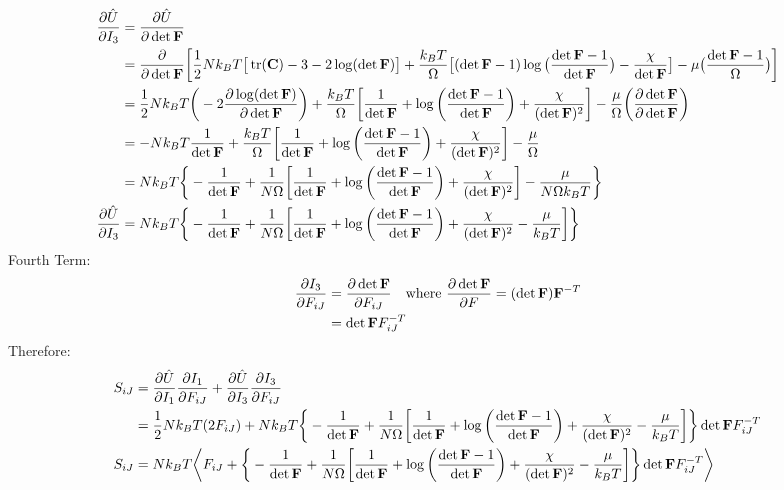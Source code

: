 \documentclass[12pt,3p]{article}
\numberwithin{equation}{section}
\begin{document}
\begin{align*}
\pdv{\hat{U}}{I_3} &= \pdv{\hat{U}}{\det \mathbf{F}} \\
			&= \pdv{}{\det \mathbf{F}} \bigg[ \frac{1}{2} N k_B T \big[ \tr (\mathbf{C}) - 3 - 2 \log (\det \mathbf{F}) \big] + \frac{k_B T}{\Omega} \big[ (\det \mathbf{F} - 1) \log \big( \frac{\det \mathbf{F} - 1}{\det \mathbf{F}} \big) - \frac{\chi}{\det \mathbf{F}} \big] - \mu \big(\frac{\det \mathbf{F} - 1}{\Omega} \big) \bigg] \\
			&= \frac{1}{2} N k_B T \bigg(-2 \pdv{\log (\det \mathbf{F})}{\det \mathbf{F}} \bigg) + \frac{k_B T}{\Omega} \bigg[ \frac{1}{\det \mathbf{F}} + \log \bigg( \frac{\det \mathbf{F} - 1}{\det \mathbf{F}} \bigg) + \frac{\chi}{(\det \mathbf{F})^2} \bigg] - \frac{\mu}{\Omega} \bigg( \pdv{\det \mathbf{F}}{\det \mathbf{F}} \bigg)\\
			&= - N k_B T \frac{1}{\det \mathbf{F}} + \frac{k_B T}{\Omega} \bigg[ \frac{1}{\det \mathbf{F}} + \log \bigg( \frac{\det \mathbf{F} - 1}{\det \mathbf{F}} \bigg) + \frac{\chi}{(\det \mathbf{F})^2} \bigg] - \frac{\mu}{\Omega} \\
			&= N k_B T \bigg\{- \frac{1}{\det \mathbf{F}} + \frac{1}{N \Omega} \bigg[ \frac{1}{\det \mathbf{F}} + \log \bigg( \frac{\det \mathbf{F} - 1}{\det \mathbf{F}} \bigg) + \frac{\chi}{(\det \mathbf{F})^2} \bigg] - \frac{\mu}{N \Omega k_B T} \bigg\} \\
\pdv{\hat{U}}{I_3} &= N k_B T \bigg\{- \frac{1}{\det \mathbf{F}} + \frac{1}{N \Omega} \bigg[ \frac{1}{\det \mathbf{F}} + \log \bigg( \frac{\det \mathbf{F} - 1}{\det \mathbf{F}} \bigg) + \frac{\chi}{(\det \mathbf{F})^2} - \frac{\mu}{k_B T} \bigg] \bigg\} 
\end{align*}
Fourth Term: 
\begin{align*}
\pdv{I_3}{F_{iJ}} &= \pdv{\det \mathbf{F}}{F_{iJ}} \quad \text{where } \pdv{\det \mathbf{F}}{F} = (\det \mathbf{F}) \mathbf{F}^{-T} \\
			&= \det \mathbf{F} F_{iJ}^{-T}
\end{align*}
Therefore: 
\begin{align*}
S_{iJ} &= \pdv{\hat{U}}{I_1} \pdv{I_1}{F_{iJ}} + \pdv{\hat{U}}{I_3} \pdv{I_3}{F_{iJ}} \\
	  &= \frac{1}{2} N k_B T (2 F_{iJ}) + N k_B T \bigg\{- \frac{1}{\det \mathbf{F}} + \frac{1}{N \Omega} \bigg[ \frac{1}{\det \mathbf{F}} + \log \bigg( \frac{\det \mathbf{F} - 1}{\det \mathbf{F}} \bigg) + \frac{\chi}{(\det \mathbf{F})^2} - \frac{\mu}{k_B T} \bigg] \bigg\} \det \mathbf{F} F_{iJ}^{-T} \\
S_{iJ} &= N k_B T \bigg \langle F_{iJ} + \bigg\{- \frac{1}{\det \mathbf{F}} + \frac{1}{N \Omega} \bigg[ \frac{1}{\det \mathbf{F}} + \log \bigg( \frac{\det \mathbf{F} - 1}{\det \mathbf{F}} \bigg) + \frac{\chi}{(\det \mathbf{F})^2} - \frac{\mu}{k_B T} \bigg] \bigg\} \det \mathbf{F} F_{iJ}^{-T}\bigg \rangle
\end{align*}
\end{document}
